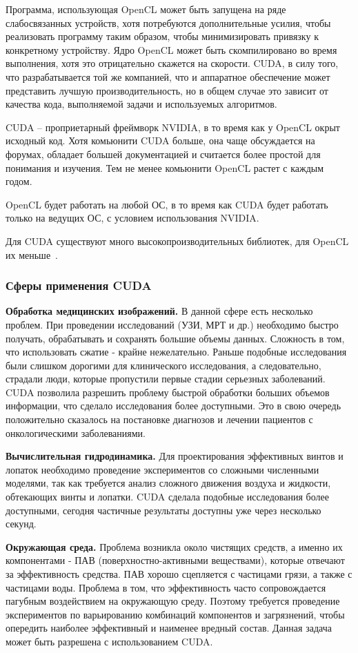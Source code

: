 Программа, использующая OpenCL может быть запущена на ряде слабосвязанных устройств, хотя потребуются дополнительные усилия, чтобы реализовать программу таким образом, чтобы минимизировать привязку к конкретному устройству. Ядро OpenCL может быть скомпилировано во время выполнения, хотя это отрицательно скажется на скорости. CUDA, в силу того, что разрабатывается той же компанией, что и аппаратное обеспечение может представить лучшую производительность, но в общем случае это зависит от качества кода, выполняемой задачи и используемых алгоритмов.

CUDA -- проприетарный фреймворк NVIDIA, в то время как у OpenCL окрыт исходный код. Хотя комьюнити CUDA больше, она чаще обсуждается на форумах, обладает большей документацией и считается более простой для понимания и изучения. Тем не менее комьюнити OpenCL растет с каждым годом.

OpenCL будет работать на любой ОС, в то время как CUDA будет работать только на ведущих ОС, с условием использования NVIDIA.

Для CUDA существуют много высокопроизводительных библиотек, для OpenCL их меньше~\cite{Krasnov2002}.

\subsubsection*{Сферы применения CUDA}
\textbf{Обработка медицинских изображений.} В данной сфере есть несколько проблем. При проведении исследований (УЗИ, МРТ и др.) необходимо быстро получать, обрабатывать и сохранять большие объемы данных. Сложность в том, что использовать сжатие - крайне нежелательно. Раньше подобные исследования были слишком дорогими для клинического исследования, а следовательно, страдали люди, которые пропустили первые стадии серьезных заболеваний. CUDA позволила разрешить проблему быстрой обработки больших объемов информации, что сделало исследования более доступными. Это в свою очередь положительно сказалось на постановке диагнозов и лечении пациентов с онкологическими заболеваниями.

\textbf{Вычислительная гидродинамика.} Для проектирования эффективных винтов и лопаток необходимо проведение экспериментов со сложными численными моделями, так как требуется анализ сложного движения воздуха и жидкости, обтекающих винты и лопатки. CUDA сделала подобные исследования более доступными, сегодня частичные результаты доступны уже через несколько секунд.

\textbf{Окружающая среда.} Проблема возникла около чистящих сре\-дств, а именно их компонентами - ПАВ (поверхностно-активными веществами), которые отвечают за эффективность средства. ПАВ хорошо сцепляется с частицами грязи, а также с частицами воды. Проблема в том, что эффективность часто сопровождается пагубным воздействием на окружающую среду. Поэтому требуется проведение экспериментов по варьированию комбинаций компонентов и загрязнений, чтобы опередить наиболее эффективный и наименее вредный состав. Данная задача может быть разрешена с использованием CUDA.